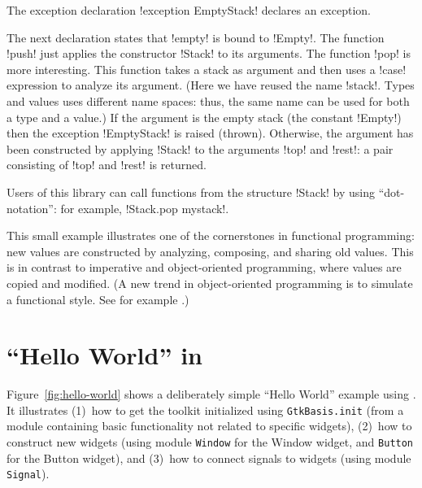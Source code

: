 \documentclass[finalversion]{usetex-v1}
\begin{document}
The exception declaration !exception EmptyStack! declares an
exception.

The next declaration states that !empty! is bound to !Empty!.  The
function !push! just applies the constructor !Stack! to its arguments.
The function !pop! is more interesting. This function takes a stack as argument
and then uses a !case! expression to analyze its argument.  (Here we have reused the name !stack!. Types and values uses
different name spaces: thus, the same name can be used for both a type
and a value.) 
If the argument is the empty stack (the constant !Empty!) then the
exception !EmptyStack! is raised (thrown). Otherwise, the argument
has been constructed by applying !Stack! to the arguments !top! and
!rest!: a pair consisting of !top! and !rest! is returned.

Users of this library can call functions from the structure
!Stack! by using ``dot-notation'': for example, !Stack.pop mystack!.

This small example illustrates one of the cornerstones in functional
programming: new values are constructed by analyzing,
composing, and sharing old values. This is in contrast to imperative and
object-oriented programming, where values are copied and modified.
(A new trend in object-oriented programming is to simulate a
functional style. See for example \cite[Item 13 and
14]{bloch01:effective-java}.)










\section{``Hello World'' in \mgtk}
\label{sec:example}

Figure~\ref{fig:hello-world} shows a deliberately simple ``Hello World''
example using \mgtk. It illustrates (1)~how to get the toolkit
initialized using \texttt{GtkBasis.init} (from a module containing
basic \gtk functionality not related to specific widgets), (2)~how to
construct new widgets (using module \texttt{Window} for the Window
widget, and \texttt{Button} for the Button widget), and (3)~how to
connect signals to widgets (using module \texttt{Signal}).
\end{document}
